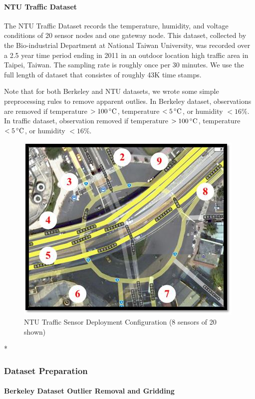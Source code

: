 \paragraph*{NTU Traffic Dataset}

The NTU Traffic Dataset records the temperature, humidity, and voltage conditions of 20 sensor nodes and one gateway node.
This dataset, collected by the Bio-industrial Department at National Taiwan University, was recorded over a 2.5 year time period ending in 2011 in an outdoor location high traffic area in Taipei, Taiwan\cite{liu2011developed}. The sampling rate is roughly once per 30 minutes. We use the full length of dataset that consistes of roughly 43K time stamps.

Note that for both Berkeley and NTU datasets, we wrote some simple preprocessing rules to remove apparent outlies. In Berkeley dataset, observations are removed if temperature \mbox{$>100\,^{\circ}\mathrm{C}$}, temperature \mbox{$<5\,^{\circ}\mathrm{C}$}, or humidity \mbox{$<16\%$}. In traffic dataset, observation removed if temperature \mbox{$>100\,^{\circ}\mathrm{C}$}, temperature \mbox{$<5\,^{\circ}\mathrm{C}$}, or humidity \mbox{$<16\%$}.
\begin{figure}[H]
\centering
\includegraphics[scale=0.5]{traffic_wsn.png}
\caption{NTU Traffic Sensor Deployment Configuration (8 sensors of 20 shown)}
\end{figure}

*\subsubsection{Dataset Preparation}

\paragraph*{Berkeley Dataset Outlier Removal and Gridding}

